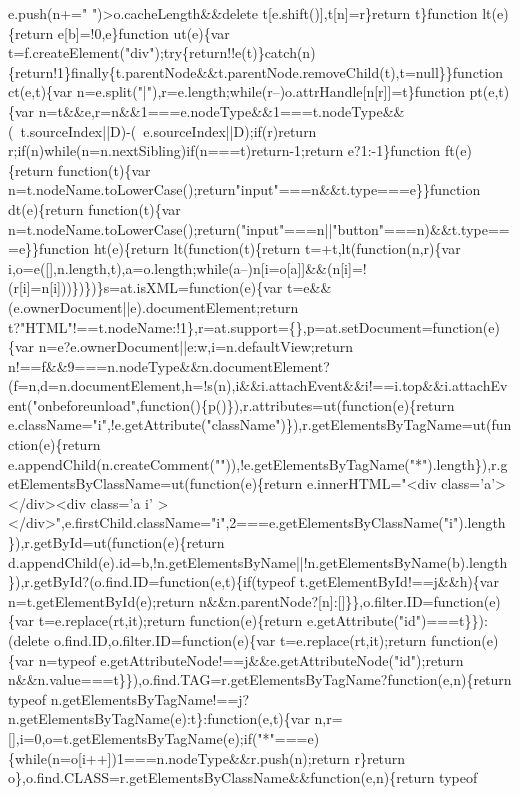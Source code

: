 \begin{DoxyCode}
{       e.push(n+=" ")>o.cacheLength&&delete t[e.shift()],t[n]=r\}return t\}function lt(e)\{return e[b]=!0,e\}function
       ut(e)\{var
       t=f.createElement("div");try\{return!!e(t)\}catch(n)\{return!1\}finally\{t.parentNode&&t.parentNode.removeChild(t),t=null\}\}function ct(e,t)\{var n=e.split("|"),r=e.length;while(r--)o.attrHandle[n[r]]=t\}function
       pt(e,t)\{var n=t&&e,r=n&&1===e.nodeType&&1===t.nodeType&&(~t.sourceIndex||D)-(~e.sourceIndex||D);if(r)return
       r;if(n)while(n=n.nextSibling)if(n===t)return-1;return e?1:-1\}function ft(e)\{return function(t)\{var
       n=t.nodeName.toLowerCase();return"input"===n&&t.type===e\}\}function dt(e)\{return function(t)\{var
       n=t.nodeName.toLowerCase();return("input"===n||"button"===n)&&t.type===e\}\}function ht(e)\{return lt(function(t)\{return
       t=+t,lt(function(n,r)\{var
       i,o=e([],n.length,t),a=o.length;while(a--)n[i=o[a]]&&(n[i]=!(r[i]=n[i]))\})\})\}s=at.isXML=function(e)\{var t=e&&(e.ownerDocument||e).documentElement;return
       t?"HTML"!==t.nodeName:!1\},r=at.support=\{\},p=at.setDocument=function(e)\{var n=e?e.ownerDocument||e:w,i=n.defaultView;return
       n!==f&&9===n.nodeType&&n.documentElement?
      (f=n,d=n.documentElement,h=!s(n),i&&i.attachEvent&&i!==i.top&&i.attachEvent("onbeforeunload",function()\{p()\}),r.attributes=ut(function(e)\{return
       e.className="i",!e.getAttribute("className")\}),r.getElementsByTagName=ut(function(e)\{return
       e.appendChild(n.createComment("")),!e.getElementsByTagName("*").length\}),r.getElementsByClassName=ut(function(e)\{return e.innerHTML="<div class='}a\textcolor{stringliteral}{'></div><div class='}a i\textcolor{stringliteral}{'
      ></div>",e.firstChild.className="i",2===e.getElementsByClassName("i").length\}),r.getById=ut(function(e)\{return
       d.appendChild(e).id=b,!n.getElementsByName||!n.getElementsByName(b).length\}),r.getById?(o.find.ID=function(e,t)\{if(typeof
       t.getElementById!==j&&h)\{var n=t.getElementById(e);return n&&n.parentNode?[n]:[]\}\},o.filter.ID=function(e)\{var
       t=e.replace(rt,it);return function(e)\{return e.getAttribute("id")===t\}\}):(delete
       o.find.ID,o.filter.ID=function(e)\{var t=e.replace(rt,it);return function(e)\{var n=typeof
       e.getAttributeNode!==j&&e.getAttributeNode("id");return n&&n.value===t\}\}),o.find.TAG=r.getElementsByTagName?function(e,n)\{return typeof
       n.getElementsByTagName!==j?n.getElementsByTagName(e):t\}:function(e,t)\{var
       n,r=[],i=0,o=t.getElementsByTagName(e);if("*"===e)\{while(n=o[i++])1===n.nodeType&&r.push(n);return r\}return
       o\},o.find.CLASS=r.getElementsByClassName&&function(e,n)\{return typeof
}
\end{DoxyCode}

